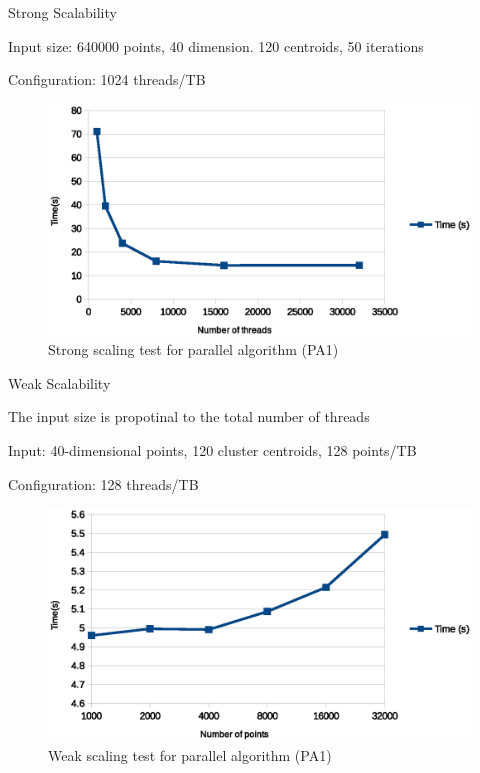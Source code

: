 \documentclass[
nopagebreaks,
style=klope,
fleqn]{powerdot}
\begin{document}
\begin{slide}{Strong Scalability}
  \begin{compactitem}
  \item{Input size: 640000 points, 40 dimension. 120 centroids, 50 iterations}
  \item{Configuration: 1024 threads/TB}
  \end{compactitem}
  \begin{figure}[!h]
    \centering
    \includegraphics[width=0.7\linewidth]{fig/strong_scaling}
    \caption{Strong scaling test for parallel algorithm (PA1)}
    \label{fig:strong_scaling}
  \end{figure}
\end{slide}

\begin{slide}{Weak Scalability}
  \begin{compactitem}
  \item{The input size is propotinal to the total number of threads}
  \item{Input: 40-dimensional points, 120 cluster centroids, 128 points/TB}
  \item{Configuration: 128 threads/TB}
  \end{compactitem}
  \begin{figure}[!h]
    \centering
    \includegraphics[width=0.7\linewidth]{fig/weak_scaling}
    \caption{Weak scaling test for parallel algorithm (PA1)}
    \label{fig:weak_scaling}
  \end{figure}
\end{slide}
\end{document}
